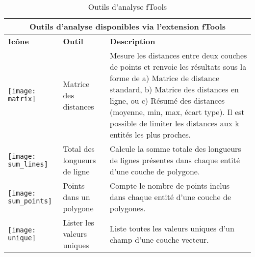 \begin{table}[ht]
\centering
\caption{Outils d'analyse fTools}\label{tab:ftool_analysis}\medskip
 \begin{tabular}{|p{0.3in}|p{1.2in}|p{4.7in}|}
 \hline \multicolumn{3}{|c|}{\textbf{Outils d'analyse disponibles via l'extension fTools}} \\
 \hline \textbf{Icône} & \textbf{Outil} & \textbf{Description} \\
 \hline \texttt{[image: matrix]} & Matrice des distances & Mesure les distances entre deux couches de points et renvoie les résultats sous la forme de a) Matrice de distance standard, b) Matrice des distances en ligne, ou c) Résumé des distances (moyenne, min, max, écart type). Il est possible de limiter les distances aux k entités les plus proches. \\ 
 \hline \texttt{[image: sum\_lines]} & Total des longueurs de ligne & Calcule la somme totale des longueurs de lignes présentes dans chaque entité d'une couche de polygone. \\
 \hline \texttt{[image: sum\_points]} & Points dans un polygone & Compte le nombre de points inclus dans chaque entité d'une couche de polygones. \\
 \hline \texttt{[image: unique]} & Lister les valeurs uniques & Liste toutes les valeurs uniques d'un champ d'une couche vecteur. \\

\end{tabular}
\end{table}
